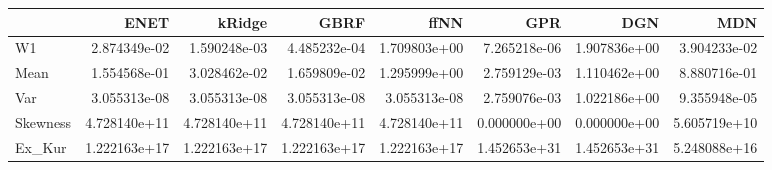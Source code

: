 \begin{tabular}{lrrrrrrr}
\toprule
{} &          ENET &        kRidge &          GBRF &          ffNN &           GPR &           DGN &           MDN \\
\midrule
W1       &  2.874349e-02 &  1.590248e-03 &  4.485232e-04 &  1.709803e+00 &  7.265218e-06 &  1.907836e+00 &  3.904233e-02 \\
Mean     &  1.554568e-01 &  3.028462e-02 &  1.659809e-02 &  1.295999e+00 &  2.759129e-03 &  1.110462e+00 &  8.880716e-01 \\
Var      &  3.055313e-08 &  3.055313e-08 &  3.055313e-08 &  3.055313e-08 &  2.759076e-03 &  1.022186e+00 &  9.355948e-05 \\
Skewness &  4.728140e+11 &  4.728140e+11 &  4.728140e+11 &  4.728140e+11 &  0.000000e+00 &  0.000000e+00 &  5.605719e+10 \\
Ex\_Kur   &  1.222163e+17 &  1.222163e+17 &  1.222163e+17 &  1.222163e+17 &  1.452653e+31 &  1.452653e+31 &  5.248088e+16 \\
\bottomrule
\end{tabular}
